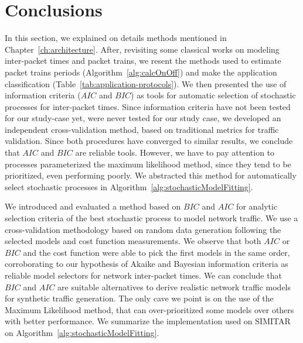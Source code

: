  




\section{Conclusions}


In this section, we explained on details methods mentioned in Chapter~\ref{ch:architecture}. 
After,  revisiting some classical works on modeling inter-packet times and packet trains,  we resent the methods used to estimate packet trains periods (Algorithm~\ref{alg:calcOnOff}) and make the application classification (Table~\ref{tab:application-protocols}). We then presented the use of information criteria ($AIC$ and $BIC$) as tools for automatic selection of stochastic processes for inter-packet times. Since information criteria have not been tested for our study-case yet, were never tested for our study case, we developed an independent cross-validation method, based on traditional metrics for traffic validation. Since both procedures have converged to similar results, we conclude that $AIC$ and $BIC$ are reliable tools. However, we have to pay attention to processes parameterized the maximum likelihood method, since they tend to be prioritized, even performing poorly.  We abstracted this method for automatically select stochastic processes in Algorithm~\ref{alg:stochasticModelFitting}. 
 
 

We introduced and evaluated a method based on $BIC$ and $AIC$ for analytic selection criteria of the best stochastic process to model network traffic. We use a cross-validation methodology based on random data generation following the selected models and cost function measurements. We observe that both $AIC$ or $BIC$ and the cost function were able to pick the first models in the same order, corroborating to our hypothesis of Akaike and Bayesian information criteria as reliable model selectors for network inter-packet times. We can conclude that $BIC$ and $AIC$ are suitable alternatives to derive realistic network traffic models for synthetic traffic generation. The only cave we point is on the use of the Maximum Likelihood method, that can over-prioritized some models over others with better performance. We summarize the implementation used on SIMITAR on Algorithm~\ref{alg:stochasticModelFitting}.

